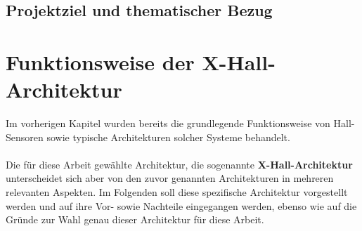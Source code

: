 \documentclass[12pt, a4paper]{article}
\begin{document}
	
	\subsection{Projektziel und thematischer Bezug}
	
	
	\section{Funktionsweise der X-Hall-Architektur}
		Im vorherigen Kapitel wurden bereits die grundlegende Funktionsweise von Hall-Sensoren sowie typische Architekturen solcher Systeme behandelt.\paragraph{}
		Die für diese Arbeit gewählte Architektur, die sogenannte \textbf{X-Hall-Architektur} unterscheidet sich aber von den zuvor genannten Architekturen in mehreren relevanten Aspekten. Im Folgenden soll diese spezifische Architektur vorgestellt werden und auf ihre Vor- sowie Nachteile eingegangen werden, ebenso wie auf die Gründe zur Wahl genau dieser %
		Architektur für diese Arbeit.
		
\end{document}
